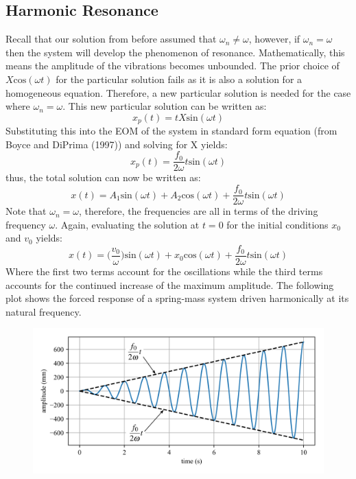 \documentclass[12pt,letter]{article}
\numberwithin{ex}{section} %
\numberwithin{re}{section} %
\begin{document}
			
		\subsection{Harmonic Resonance}			
			
			Recall that our solution from before assumed that $\omega_n \neq \omega$, however, if $\omega_n = \omega$ then the system will develop the phenomenon of resonance. Mathematically, this means the amplitude of the vibrations becomes unbounded. The prior choice of $X\text{cos}(\omega t)$ for the particular solution fails as it is also a solution for a homogeneous equation. Therefore, a new particular solution is needed for the case where $\omega_n = \omega$. This new particular solution can be written as:
			\begin{equation}
				x_p(t) = t X\text{sin}(\omega t)
			\end{equation}				
			Substituting this into the EOM of the system in standard form equation (from Boyce and DiPrima (1997)) and solving for X yields:
			\begin{equation}
				x_p(t) = \frac{f_0}{2 \omega} t \text{sin}(\omega t)
			\end{equation}	
			thus, the total solution can now be written as:
			\begin{equation}
				x(t) = A_1\text{sin}(\omega t) + A_2\text{cos}(\omega t) + \frac{f_0}{2 \omega} t \text{sin}(\omega t)
			\end{equation}			
			Note that $\omega_n=\omega$, therefore, the frequencies are all in terms of the driving frequency $\omega$. Again, evaluating the solution at $t=0$ for the initial conditions $x_0$ and $v_0$ yields:
			\begin{equation}
				x(t) = \Big(\frac{v_0}{\omega}\Big)\text{sin}(\omega t) + x_0\text{cos}(\omega t) + \frac{f_0}{2 \omega} t \text{sin}(\omega t)
			\end{equation}			
			Where the first two terms account for the oscillations while the third terms accounts for the continued increase of the maximum amplitude. The following plot shows the forced response of a spring-mass system driven harmonically at its natural frequency.
			\begin{figure}[H]
				\centering
				\includegraphics[]{../Figures/resonance.png}
			\end{figure}				
\end{document}
